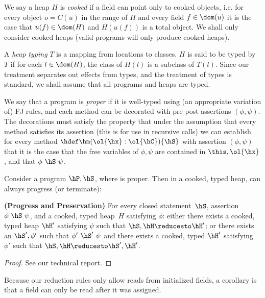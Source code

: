 
We say a heap $H$ is {\em cooked} if a field can point only to cooked
objects, i.e.{} for every object $o=C(u)$ in the range of $H$ and
every field $f \in \dom(u)$ it is the case that $u(f)\in \dom (H)$ and
$H(u(f))$ is a total object. We shall only consider cooked heaps (valid
programs will only produce cooked heaps).

A {\em heap typing} $T$ is a mapping from locations to classes. $H$ is
said to be typed by $T$ if for each $l\in\dom(H)$, the class of $H(l)$
is a subclass of $T(l)$.  Since our treatment separates out effects
from types, and the treatment of types is standard, we shall assume
that all programs and heaps are typed.

We say that a program \hP{} is {\em proper} if it is well-typed using
(an appropriate variation of) FJ rules, and each method can be
decorated with pre-post assertions $(\phi,\psi)$. The decorations must
satisfy the property that under the assumption that every method
satisfies its assertion (this is for use in recursive calls) we can
establish for every method $\hdef\hm(\ol{\hx}:\ol{\hC})\{\hS\}$ with
assertion $(\phi,\psi)$ that it is the case that the free variables of
$\phi,\psi$ are contained in $\this,\ol{\hx}$, and that
$\phi~\hS~\psi$.

Consider a program $\hP,\hS$, where \hP is proper.  Then in a cooked,
typed heap, \hS can always progress (or terminate):

\begin{Theorem}[preservation]
  \textbf{(Progress and Preservation)} For every closed
  statement~$\hS$, assertion $\phi~\hS~\psi$, and a cooked, typed
  heap~$H$ satisfying $\phi$: either there exists a cooked, typed heap $\hH'$
  satisfying $\psi$ such that $\hS,\hH \reducesto \hH'$; or there
  exists an $\hS',\phi'$ such that $\phi'~\hS'~\psi$ and there exists
  a cooked, typed $\hH'$ satisfying $\phi'$ such that $\hS,\hH \reducesto
  \hS',\hH'$.

\end{Theorem}
\begin{proof}
See our technical report.
\end{proof}
Because our reduction rules only allow reads from initialized fields,
a corollary is that a field can only be read after it was assigned.
